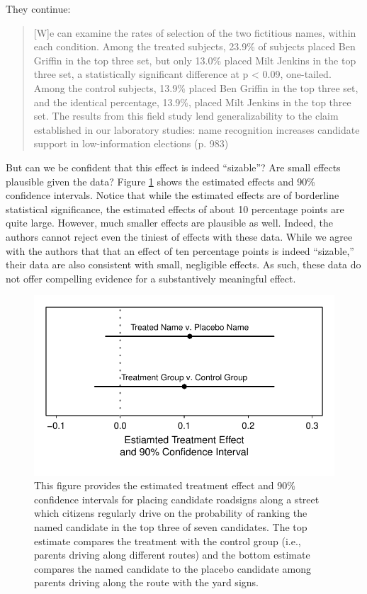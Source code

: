 \documentclass[12pt]{article}
\begin{document}
\noindent They continue:

\begin{quote}
[W]e can examine the rates of selection of the two fictitious names, within each condition. Among the treated subjects, 23.9\% of subjects placed Ben Griffin in the top three set, but only 13.0\% placed Milt Jenkins in the top three set, a statistically significant difference at p < 0.09, one-tailed. Among the control subjects, 13.9\% placed Ben Griffin in the top three set, and the identical percentage, 13.9\%, placed Milt Jenkins in the top three set. The results from this field study lend generalizability to the claim established in our laboratory studies: name recognition increases candidate support in low-information elections (p. 983)
\end{quote}

But can we be confident that this effect is indeed ``sizable''? Are small effects plausible given the data? Figure \ref{fig:kz-ci} shows the estimated effects and 90\% confidence intervals. Notice that while the estimated effects are of borderline statistical significance, the estimated effects of about 10 percentage points are quite large. However, much smaller effects are plausible as well. Indeed, the authors cannot reject even the tiniest of effects with these data. While we agree with the authors that that an effect of ten percentage points is indeed ``sizable,'' their data are also consistent with small, negligible effects. As such, these data do not offer compelling evidence for a substantively meaningful effect.

\begin{figure}[H]
\begin{center}
\includegraphics[scale = .8]{figs/kz-ci.pdf}
\caption{This figure provides the estimated treatment effect and 90\% confidence intervals for placing candidate roadsigns along a street which citizens regularly drive on the probability of ranking the named candidate in the top three of seven candidates. The top estimate compares the treatment with the control group (i.e., parents driving along different routes) and the bottom estimate compares the named candidate to the placebo candidate among parents driving along the route with the yard signs.}\label{fig:kz-ci}
\end{center}
\end{figure}
\end{document}
